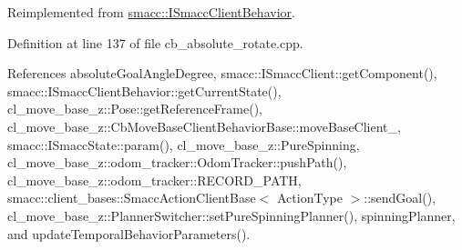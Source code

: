Reimplemented from \hyperlink{classsmacc_1_1ISmaccClientBehavior_a9877684b1954429719826e2d0924d980}{smacc\+::\+I\+Smacc\+Client\+Behavior}.



Definition at line 137 of file cb\+\_\+absolute\+\_\+rotate.\+cpp.



References absolute\+Goal\+Angle\+Degree, smacc\+::\+I\+Smacc\+Client\+::get\+Component(), smacc\+::\+I\+Smacc\+Client\+Behavior\+::get\+Current\+State(), cl\+\_\+move\+\_\+base\+\_\+z\+::\+Pose\+::get\+Reference\+Frame(), cl\+\_\+move\+\_\+base\+\_\+z\+::\+Cb\+Move\+Base\+Client\+Behavior\+Base\+::move\+Base\+Client\+\_\+, smacc\+::\+I\+Smacc\+State\+::param(), cl\+\_\+move\+\_\+base\+\_\+z\+::\+Pure\+Spinning, cl\+\_\+move\+\_\+base\+\_\+z\+::odom\+\_\+tracker\+::\+Odom\+Tracker\+::push\+Path(), cl\+\_\+move\+\_\+base\+\_\+z\+::odom\+\_\+tracker\+::\+R\+E\+C\+O\+R\+D\+\_\+\+P\+A\+TH, smacc\+::client\+\_\+bases\+::\+Smacc\+Action\+Client\+Base$<$ Action\+Type $>$\+::send\+Goal(), cl\+\_\+move\+\_\+base\+\_\+z\+::\+Planner\+Switcher\+::set\+Pure\+Spinning\+Planner(), spinning\+Planner, and update\+Temporal\+Behavior\+Parameters().


